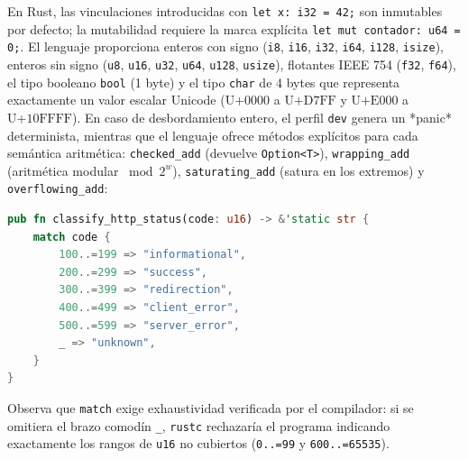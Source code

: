 \documentclass{book}
\begin{document}
En Rust, las vinculaciones introducidas con \texttt{let x: i32 = 42;} son inmutables por defecto; la mutabilidad requiere la marca explícita \texttt{let mut contador: u64 = 0;}. El lenguaje proporciona enteros con signo (\texttt{i8}, \texttt{i16}, \texttt{i32}, \texttt{i64}, \texttt{i128}, \texttt{isize}), enteros sin signo (\texttt{u8}, \texttt{u16}, \texttt{u32}, \texttt{u64}, \texttt{u128}, \texttt{usize}), flotantes IEEE 754 (\texttt{f32}, \texttt{f64}), el tipo booleano \texttt{bool} (1 byte) y el tipo \texttt{char} de 4 bytes que representa exactamente un valor escalar Unicode (\(\text{U+0000}\) a \(\text{U+D7FF}\) y \(\text{U+E000}\) a \(\text{U+10FFFF}\)). En caso de desbordamiento entero, el perfil \texttt{dev} genera un *panic* determinista, mientras que el lenguaje ofrece métodos explícitos para cada semántica aritmética: \texttt{checked\_add} (devuelve \texttt{Option<T>}), \texttt{wrapping\_add} (aritmética modular \(\bmod 2^w\)), \texttt{saturating\_add} (satura en los extremos) y \texttt{overflowing\_add}:
\begin{lstlisting}[style=studium,language={Rust}]
pub fn classify_http_status(code: u16) -> &'static str {
    match code {
        100..=199 => "informational",
        200..=299 => "success",
        300..=399 => "redirection",
        400..=499 => "client_error",
        500..=599 => "server_error",
        _ => "unknown",
    }
}
\end{lstlisting}
Observa que \texttt{match} exige exhaustividad verificada por el compilador: si se omitiera el brazo comodín \texttt{\_}, \texttt{rustc} rechazaría el programa indicando exactamente los rangos de \texttt{u16} no cubiertos (\texttt{0..=99} y \texttt{600..=65535}).
\end{document}
